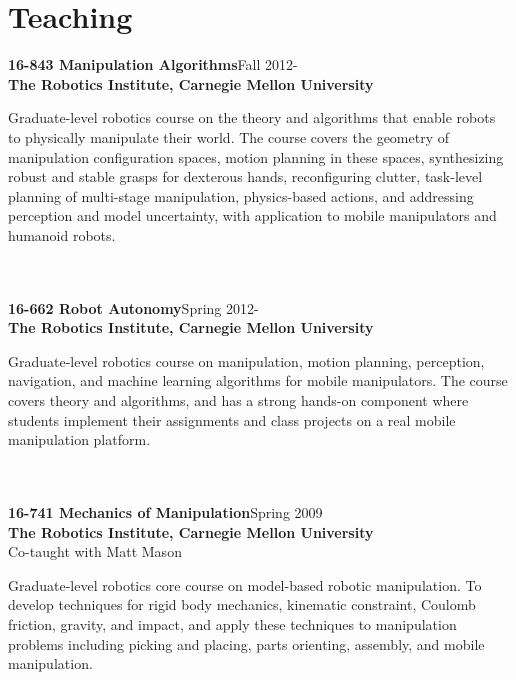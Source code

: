 
\section{Teaching}
\noindent
\textbf{16-843 Manipulation Algorithms}\hfill Fall 2012-\\
\textbf{The Robotics Institute, Carnegie Mellon University}\\
\parbox[t]{0.75\textwidth}{
Graduate-level robotics course on the theory and algorithms that enable robots to physically manipulate their world. The course covers the geometry of manipulation configuration spaces, motion planning in these spaces, synthesizing robust and stable grasps for dexterous hands, reconfiguring clutter, task-level planning of multi-stage manipulation, physics-based actions, and addressing perception and model uncertainty, with application to mobile manipulators and humanoid robots.
}\\
\\
\noindent
\textbf{16-662 Robot Autonomy}\hfill Spring 2012-\\
\textbf{The Robotics Institute, Carnegie Mellon University}\\
\parbox[t]{0.75\textwidth}{
Graduate-level robotics course on manipulation, motion planning, perception, navigation,
and machine learning algorithms for mobile manipulators. The course covers theory and algorithms,
and has a strong hands-on component where students implement their assignments and class projects on a real mobile manipulation platform.
}\\
\\
\textbf{16-741 Mechanics of Manipulation}\hfill Spring 2009\\
\textbf{The Robotics Institute, Carnegie Mellon University}\\
Co-taught with Matt Mason\\
\parbox[t]{0.75\textwidth}{
Graduate-level robotics core course on model-based robotic manipulation.
To develop techniques for rigid body mechanics, kinematic constraint, Coulomb
friction, gravity, and impact, and apply these techniques to manipulation
problems including picking and placing, parts orienting, assembly, and mobile
manipulation. 
}\\
